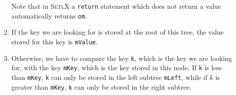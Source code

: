 \begin{enumerate}
\begin{enumerate}
            Note that in \textsc{SetlX} a \texttt{return} statement which does not return a value 
            automatically returns \texttt{om}.
      \item If the key we are looking for is stored at the root of this tree, the value stored for
            this key is \texttt{mValue}.
      \item Otherwise, we have to compare the key \texttt{k}, which is the key we are looking for,
            with the key \texttt{mKey}, which is the key stored in this node.  If \texttt{k}
            is less than \texttt{mKey}, \texttt{k} can only be stored in the left subtree
            \texttt{mLeft}, while if $k$ is greater than \texttt{mKey}, \texttt{k} can only be
            stored in the right subtree.
      \end{enumerate}



\end{enumerate}

